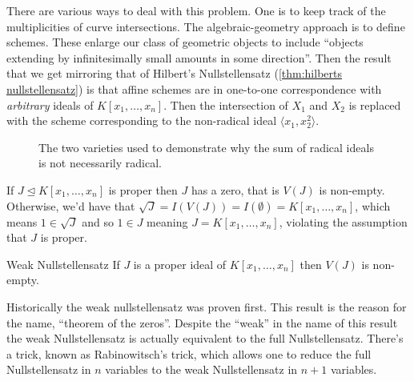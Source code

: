 \documentclass[fleqn]{NotesClass}
\newcommand{\subideal}{\trianglelefteq}
\begin{document}
\begin{remark}{}{}
        There are various ways to deal with this problem.
        One is to keep track of the multiplicities of curve intersections.
        The algebraic-geometry approach is to define schemes.
        These enlarge our class of geometric objects to include \enquote{objects extending by infinitesimally small amounts in some direction}.
        Then the result that we get mirroring that of Hilbert's Nullstellensatz (\cref{thm:hilberts nullstellensatz}) is that affine schemes are in one-to-one correspondence with \emph{arbitrary} ideals of \(K[x_1, \dotsc, x_n]\).
        Then the intersection of \(X_1\) and \(X_2\) is replaced with the scheme corresponding to the non-radical ideal \(\langle x_1, x_2^2 \rangle\).
    \end{remark}
    
    \begin{figure}
        \centering
        \caption[Sum of radicals not radical]{The two varieties used to demonstrate why the sum of radical ideals is not necessarily radical.}
        \label{fig:sum radicals not radical}
    \end{figure}
    
    If \(J \subideal K[x_1, \dotsc, x_n]\) is proper then \(J\) has a zero, that is \(V(J)\) is non-empty.
    Otherwise, we'd have that \(\sqrt{J} = I(V(J)) = I(\emptyset) = K[x_1, \dotsc, x_n]\), which means \(1 \in \sqrt{J}\) and so \(1 \in J\) meaning \(J = K[x_1, \dotsc, x_n]\), violating the assumption that \(J\) is proper.
    
    \begin{prp}{Weak Nullstellensatz}{}
        If \(J\) is a proper ideal of \(K[x_1, \dotsc, x_n]\) then \(V(J)\) is non-empty.
    \end{prp}
    
    \begin{remark}{}{}
        Historically the weak nullstellensatz was proven first.
        This result is the reason for the name, \enquote{theorem of the zeros}.
        Despite the \enquote{weak} in the name of this result the weak Nullstellensatz is actually equivalent to the full Nullstellensatz.
        There's a trick, known as Rabinowitsch's trick, which allows one to reduce the full Nullstellensatz in \(n\) variables to the weak Nullstellensatz in \(n + 1\) variables.
    \end{remark}
    
    \appendixpage
    \begin{appendices}
        
    \end{appendices}
    \backmatter
    \renewcommand{\glossaryname}{Acronyms}
    \printglossary[acronym]
    \printindex
\end{document}
